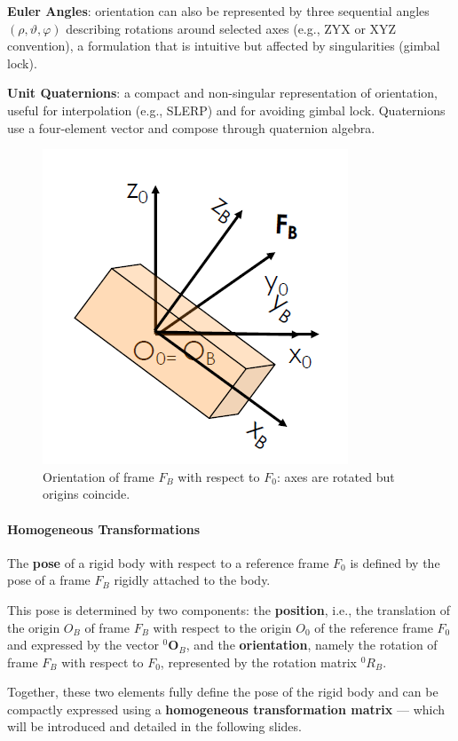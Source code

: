 \textbf{Euler Angles}: orientation can also be represented by three sequential angles $(\rho, \vartheta, \varphi)$ describing rotations around selected axes (e.g., ZYX or XYZ convention), a formulation that is intuitive but affected by singularities (gimbal lock).

\textbf{Unit Quaternions}: a compact and non-singular representation of orientation, useful for interpolation (e.g., SLERP) and for avoiding gimbal lock. Quaternions use a four-element vector and compose through quaternion algebra.

\begin{figure}[H]
  \centering
  \includegraphics[width=0.4\linewidth]{imgs/relative_orientation.png}
  \caption{Orientation of frame $F_B$ with respect to $F_0$: axes are rotated but origins coincide.}
\end{figure}

\hfill

\paragraph{Homogeneous Transformations} \hfill

The \textbf{pose} of a rigid body with respect to a reference frame $F_0$ is defined by the pose of a frame $F_B$ rigidly attached to the body.

This pose is determined by two components: the \textbf{position}, i.e., the translation of the origin $O_B$ of frame $F_B$ with respect to the origin $O_0$ of the reference frame $F_0$ and expressed by the vector ${}^0\mathbf{O}_B$, and the \textbf{orientation}, namely the rotation of frame $F_B$ with respect to $F_0$, represented by the rotation matrix ${}^0R_B$.

Together, these two elements fully define the pose of the rigid body and can be compactly expressed using a \textbf{homogeneous transformation matrix} — which will be introduced and detailed in the following slides.

